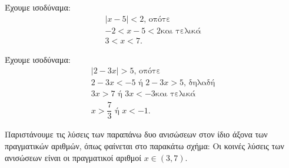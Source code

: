 
\begin{alist}
\item Έχουμε ισοδύναμα:
\begin{gather*}
|x - 5| < 2\text{, οπότε} \\
-2 < x - 5 < 2\text{και τελικά} \\
3 < x < 7.
\end{gather*}

\item Έχουμε ισοδύναμα:
\begin{gather*}
|2 - 3x| > 5\text{, οπότε} \\
2 - 3x < -5 \text{ ή } 2 - 3x > 5\text{, δηλαδή} \\
3x > 7 \text{ ή } 3x < -3\text{και τελικά} \\
x > \dfrac{7}{3} \text{ ή } x < -1.
\end{gather*}

\item Παριστάνουμε τις λύσεις των παραπάνω δυο ανισώσεων στον ίδιο άξονα των πραγματικών αριθμών, όπως φαίνεται στο παρακάτω σχήμα:
Οι κοινές λύσεις των ανισώσεων είναι οι πραγματικοί αριθμοί $x \in (3, 7)$.
\end{alist}

